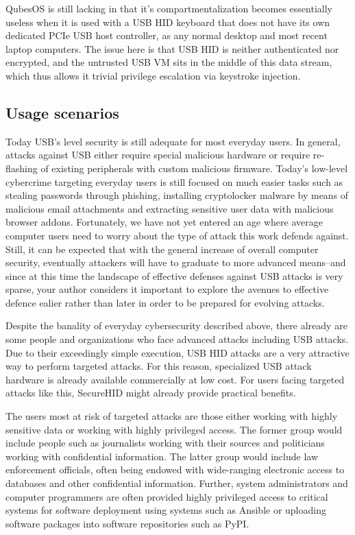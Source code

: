 \documentclass[12pt,a4paper,notitlepage]{article}
\begin{document}
QubesOS is still lacking in that it's compartmentalization becomes essentially useless when it is used with a USB HID
keyboard that does not have its own dedicated PCIe USB host controller, as any normal desktop and most recent laptop
computers. The issue here is that USB HID is neither authenticated nor encrypted, and the untrusted USB VM sits in the
middle of this data stream, which thus allows it trivial privilege escalation via keystroke injection.

\subsection{Usage scenarios}

Today USB's level security is still adequate for most everyday users. In general, attacks against USB either require
special malicious hardware or require re-flashing of existing peripherals with custom malicious firmware. Today's
low-level cybercrime targeting everyday users is still focused on much easier tasks such as stealing passwords through
phishing, installing cryptolocker malware by means of malicious email attachments and extracting sensitive user data
with malicious browser addons. Fortunately, we have not yet entered an age where average computer users need to worry
about the type of attack this work defends against. Still, it can be expected that with the general increase of overall
computer security, eventually attackers will have to graduate to more advanced means--and since at this time the
landscape of effective defenses against USB attacks is very sparse, your author considers it important to explore the
avenues to effective defence ealier rather than later in order to be prepared for evolving attacks.

Despite the banality of everyday cybersecurity described above, there already are some people and organizations who face
advanced attacks including USB attacks. Due to their exceedingly simple execution, USB HID attacks are a very attractive
way to perform targeted attacks. For this reason, specialized USB attack hardware is already available commercially at
low cost. For users facing targeted attacks like this, SecureHID might already provide practical benefits.

The users most at risk of targeted attacks are those either working with highly sensitive data or working with highly
privileged access. The former group would include people such as journalists working with their sources and politicians
working with confidential information. The latter group would include law enforcement officials, often being endowed
with wide-ranging electronic access to databases and other confidential information. Further, system administrators and
computer programmers are often provided highly privileged access to critical systems for software deployment using
systems such as Ansible or uploading software packages into software repositories such as PyPI.
\end{document}
